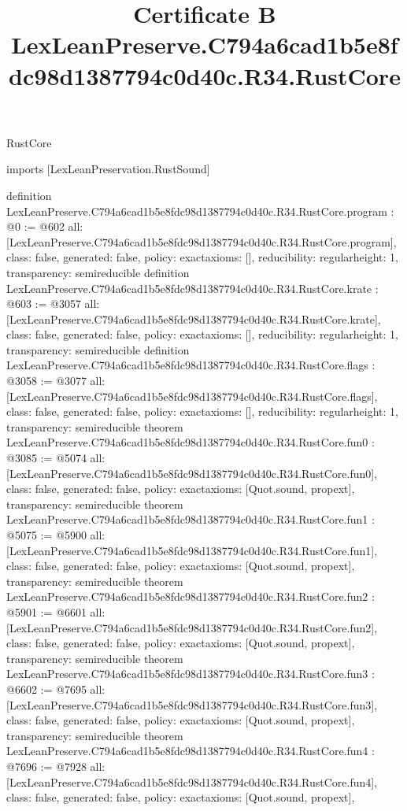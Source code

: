 \begin{lexlean}{RustCore}
\title{Certificate B LexLeanPreserve.C794a6cad1b5e8fdc98d1387794c0d40c.R34.RustCore}
\begin{coremodule}
imports [LexLeanPreservation.RustSound]

definition LexLeanPreserve.C794a6cad1b5e8fdc98d1387794c0d40c.R34.RustCore.program : @0 := @602 {
  all: [LexLeanPreserve.C794a6cad1b5e8fdc98d1387794c0d40c.R34.RustCore.program],
  class: false,
  generated: false,
  policy: exact{axioms: []},
  reducibility: regular{height: 1},
  transparency: semireducible
}
definition LexLeanPreserve.C794a6cad1b5e8fdc98d1387794c0d40c.R34.RustCore.krate : @603 := @3057 {
  all: [LexLeanPreserve.C794a6cad1b5e8fdc98d1387794c0d40c.R34.RustCore.krate],
  class: false,
  generated: false,
  policy: exact{axioms: []},
  reducibility: regular{height: 1},
  transparency: semireducible
}
definition LexLeanPreserve.C794a6cad1b5e8fdc98d1387794c0d40c.R34.RustCore.flags : @3058 := @3077 {
  all: [LexLeanPreserve.C794a6cad1b5e8fdc98d1387794c0d40c.R34.RustCore.flags],
  class: false,
  generated: false,
  policy: exact{axioms: []},
  reducibility: regular{height: 1},
  transparency: semireducible
}
theorem LexLeanPreserve.C794a6cad1b5e8fdc98d1387794c0d40c.R34.RustCore.fun0 : @3085 := @5074 {
  all: [LexLeanPreserve.C794a6cad1b5e8fdc98d1387794c0d40c.R34.RustCore.fun0],
  class: false,
  generated: false,
  policy: exact{axioms: [Quot.sound, propext]},
  transparency: semireducible
}
theorem LexLeanPreserve.C794a6cad1b5e8fdc98d1387794c0d40c.R34.RustCore.fun1 : @5075 := @5900 {
  all: [LexLeanPreserve.C794a6cad1b5e8fdc98d1387794c0d40c.R34.RustCore.fun1],
  class: false,
  generated: false,
  policy: exact{axioms: [Quot.sound, propext]},
  transparency: semireducible
}
theorem LexLeanPreserve.C794a6cad1b5e8fdc98d1387794c0d40c.R34.RustCore.fun2 : @5901 := @6601 {
  all: [LexLeanPreserve.C794a6cad1b5e8fdc98d1387794c0d40c.R34.RustCore.fun2],
  class: false,
  generated: false,
  policy: exact{axioms: [Quot.sound, propext]},
  transparency: semireducible
}
theorem LexLeanPreserve.C794a6cad1b5e8fdc98d1387794c0d40c.R34.RustCore.fun3 : @6602 := @7695 {
  all: [LexLeanPreserve.C794a6cad1b5e8fdc98d1387794c0d40c.R34.RustCore.fun3],
  class: false,
  generated: false,
  policy: exact{axioms: [Quot.sound, propext]},
  transparency: semireducible
}
theorem LexLeanPreserve.C794a6cad1b5e8fdc98d1387794c0d40c.R34.RustCore.fun4 : @7696 := @7928 {
  all: [LexLeanPreserve.C794a6cad1b5e8fdc98d1387794c0d40c.R34.RustCore.fun4],
  class: false,
  generated: false,
  policy: exact{axioms: [Quot.sound, propext]},
}
\end{coremodule}
\end{lexlean}
